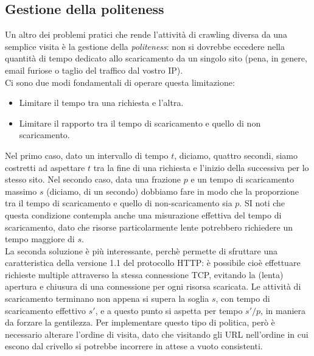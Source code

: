 \subsection{Gestione della politeness}
Un altro dei problemi pratici che rende l'attività di crawling diversa da una semplice visita è la gestione della \textit{politeness}: non si dovrebbe eccedere nella quantità di tempo dedicato allo scaricamento da un singolo sito (pena, in genere, email furiose o taglio del traffico dal vostro IP).\\
Ci sono due modi fondamentali di operare questa limitazione:
\begin{itemize}
    \item Limitare il tempo tra una richiesta e l'altra.
    \item Limitare il rapporto tra il tempo di scaricamento e quello di non scaricamento.
\end{itemize}
Nel primo caso, dato un intervallo di tempo $t$, diciamo, quattro secondi, siamo costretti ad aspettare $t$ tra la fine di una richiesta e l'inizio della successiva per lo stesso sito. Nel secondo caso, data una frazione $p$ e un tempo di scaricamento massimo $s$ (diciamo, di un secondo) dobbiamo fare in modo che la proporzione tra il tempo di scaricamento e quello di non-scaricamento sia $p$. SI noti che questa condizione contempla anche una misurazione effettiva del tempo di scaricamento, dato che risorse particolarmente lente potrebbero richiedere un tempo maggiore di $s$.\\
La seconda soluzione è più interessante, perchè permette di sfruttare una caratteristica della versione 1.1 del protocollo HTTP: è possibile cioè effettuare richieste multiple attraverso la stessa connessione TCP, evitando la (lenta) apertura e chiusura di una connessione per ogni risorsa scaricata. Le attività di scaricamento terminano non appena si supera la soglia $s$, con tempo di scaricamento effettivo $s'$, e a questo punto si aspetta per tempo $s'/p$, in maniera da forzare la gentilezza.
Per implementare questo tipo di politica, però è necessario alterare l'ordine di visita, dato che visitando gli URL nell'ordine in cui escono dal crivello si potrebbe incorrere in attese a vuoto consistenti.
